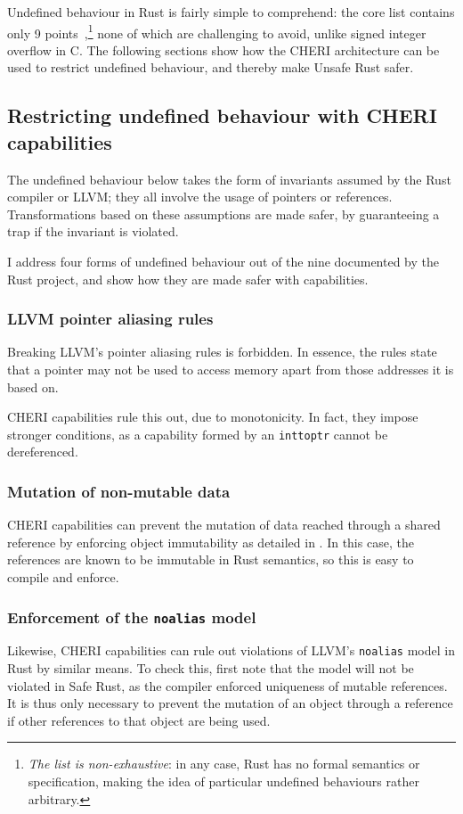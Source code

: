 \documentclass[dissertation.tex]{subfiles}
\begin{document}
Undefined behaviour in Rust is fairly simple to comprehend:
the core list contains only 9 points~\cite{rust-undef},\footnote{
\emph{The list is non-exhaustive}: in any case, Rust has no formal
semantics or specification, making the idea of particular undefined
behaviours rather arbitrary.}
none of which are challenging to avoid, unlike signed integer overflow
in C.
The following sections show how the CHERI architecture can be used to
restrict undefined behaviour, and thereby make Unsafe Rust safer.


\subsection{Restricting undefined behaviour with CHERI capabilities}
The undefined behaviour below takes the form of invariants assumed by
the Rust compiler or LLVM; they all involve the usage of pointers or
references.
Transformations based on these assumptions are made safer, by
guaranteeing a trap if the invariant is violated.

I address four forms of undefined behaviour out of the nine documented
by the Rust project, and show how they are made safer with capabilities.

\subsubsection{LLVM pointer aliasing rules}
Breaking LLVM's pointer aliasing rules is forbidden.
In essence, the rules state that a pointer may not be used to access
memory apart from those addresses it is based on.

CHERI capabilities rule this out, due to monotonicity.
In fact, they impose stronger conditions, as a capability formed by an
\texttt{inttoptr} cannot be dereferenced.

\subsubsection{Mutation of non-mutable data}
CHERI capabilities can prevent the mutation of data reached through a
shared reference by enforcing object immutability as detailed in
.
In this case, the references are known to be immutable in Rust
semantics, so this is easy to compile and enforce.

\subsubsection{Enforcement of the \texttt{noalias} model}
Likewise, CHERI capabilities can rule out violations of LLVM's
\texttt{noalias} model in Rust by similar means.
To check this, first note that the model will not be violated in Safe
Rust, as the compiler enforced uniqueness of mutable references.
It is thus only necessary to prevent the mutation of an object through a
reference if other references to that object are being used.
\end{document}

